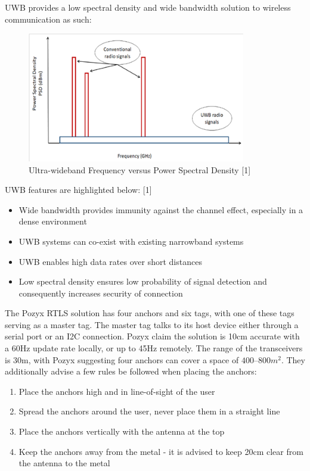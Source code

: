 \documentclass[12pt, a4paper]{article}
\begin{document}
UWB provides a low spectral density and wide bandwidth solution to wireless communication as such:
\begin{figure}[h]
    \centering
    \includegraphics[width=0.85\textwidth]{UWB vs PSD.png}
    \caption{Ultra-wideband Frequency versus Power Spectral Density [1]}
    \label{fig:uwb_psd}
\end{figure}
\newline
UWB features are highlighted below: [1]
\begin{itemize}
    \item Wide bandwidth provides immunity against the channel effect, especially in a dense environment
    \item UWB systems can co-exist with existing narrowband systems
    \item UWB enables high data rates over short distances
    \item Low spectral density ensures low probability of signal detection and consequently increases security of connection
\end{itemize}
The Pozyx RTLS solution has four anchors and six tags, with one of these tags serving as a master tag. The master tag talks to its host device either through 
a serial port or an I2C connection. Pozyx claim the solution is 10cm accurate with a 60Hz update rate locally, or up to 45Hz remotely. The range of the 
transceivers is 30m, with Pozyx suggesting four anchors can cover a space of $400 – 800m^2$. They additionally advise a few rules be followed when placing the anchors:
\begin{enumerate}
    \item Place the anchors high and in line-of-sight of the user
    \item Spread the anchors around the user, never place them in a straight line
    \item Place the anchors vertically with the antenna at the top
    \item Keep the anchors away from the metal - it is advised to keep 20cm clear from the antenna to the metal
\end{enumerate}
\end{document}
